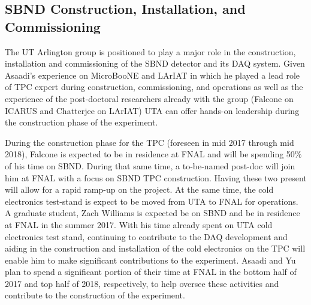 %



\subsection{SBND Construction, Installation, and Commissioning}\label{sec:SBNDBulid}
The UT Arlington group is positioned to play a major role in the construction, installation and commissioning of the SBND detector and its DAQ system. Given Asaadi's experience on MicroBooNE and LArIAT in which he played a lead role of TPC expert during construction, commissioning, and operations as well as the experience of the post-doctoral researchers already with the group (Falcone on ICARUS and Chatterjee on LArIAT) UTA can offer hands-on leadership during the construction phase of the experiment.

During the construction phase for the TPC (foreseen in mid 2017 through mid 2018), Falcone is expected to be in residence at FNAL and will be spending 50$\%$ of his time on SBND. During that same time, a to-be-named post-doc will join him at FNAL with a focus on SBND TPC construction. Having these two present will allow for a rapid ramp-up on the project. At the same time, the cold electronics test-stand is expect to be moved from UTA to FNAL for operations. A graduate student, Zach Williams is expected be on SBND and be in residence at FNAL in the summer 2017.  With his time already spent on UTA cold electronics test stand, continuing to contribute to the DAQ development and aiding in the construction and installation of the cold electronics on the TPC will enable him to make significant contributions to the experiment.  Asaadi and Yu plan to spend a significant portion of their time at FNAL in the bottom half of 2017 and top half of 2018, respectively, to help oversee these activities and contribute to the construction of the experiment.

